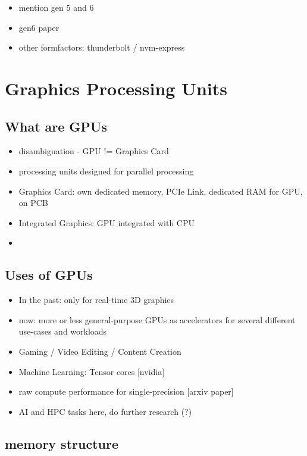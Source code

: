 \begin{itemize}
\item mention gen 5 and 6
\item gen6 paper
\item other formfactors: thunderbolt / nvm-express
\end{itemize}

\section{Graphics Processing Units}


\subsection{What are GPUs}

\begin{itemize}
\item disambiguation - GPU != Graphics Card
\item processing units designed for parallel processing
\item Graphics Card: own dedicated memory, PCIe Link, dedicated RAM for GPU, on PCB
\item Integrated Graphics: GPU integrated with CPU
\item 
\end{itemize}


\subsection{Uses of GPUs}

\begin{itemize}
\item In the past: only for real-time 3D graphics
\item now: more or less general-purpose GPUs as accelerators for several different use-cases and workloads
\item Gaming / Video Editing / Content Creation
\item Machine Learning: Tensor cores [nvidia]
\item raw compute performance for single-precision [arxiv paper]
\item AI and HPC tasks here, do further research (?)
\end{itemize}

\subsection{memory structure}

